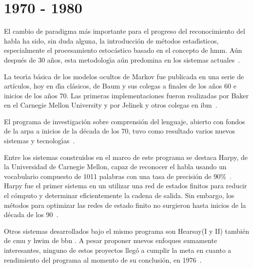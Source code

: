 \section{1970 - 1980}
\label{sec:70s}

El cambio de paradigma m\'as importante para el progreso del reconocimiento del habla ha sido, sin duda alguna,
la introducci\'on de m\'etodos estad{\'\i}sticos, especialmente el procesamiento estoc\'astico basado en el
concepto de \gls{hmm}. A\'un despu\'es de 30 a\~nos, esta metodolog{\'\i}a a\'un predomina en los
sistemas \mbox{actuales \cite{BakerResearch2009}}.

La teor{\'\i}a b\'asica de los modelos ocultos de Markov fue publicada en una serie de artículos, 
hoy en d{\'\i}a cl\'asicos, de Baum y sus colegas a finales de los a\~nos 60 e inicios de los a\~nos 70. 
Las primeras implementaciones fueron realizadas por Baker en el Carnegie Mellon University 
y por Jelinek y otros colegas en \mbox{\gls{ibm} \cite{Rabiner89atutorial}}.

El programa de investigaci\'on sobre comprensi\'on del lenguaje, abierto con fondos de la \gls{arpa} 
a inicios de la d\'ecada de los 70, tuvo como resultado varios nuevos sistemas y 
\mbox{tecnolog{\'\i}as \cite{Furui50Years2004}}.

Entre los sistemas construidos en el marco de este programa se destaca Harpy, de la Universidad de Carnegie Mellon,
capaz de reconocer el habla usando un vocabulario compuesto de 1011 palabras con una tasa de 
precisi\'on de \mbox{90\% \cite{Newell1978}.} Harpy fue el primer sistema en un utilizar una red de estados finitos
para reducir el c\'omputo y determinar eficientemente la cadena de salida. 
Sin embargo, los m\'etodos para optimizar las redes de estado finito no surgieron hasta inicios de
la d\'ecada de los \mbox{90 \cite{JuangAutomaticSpeech}}.

Otros sistemas desarrollados bajo el mismo programa son Hearsay(I y II) tambi\'en de \gls{cmu} y \gls{hwim} 
de \gls{bbn} \cite{JuangAutomaticSpeech}. A pesar proponer nuevos enfoques sumamente interesantes, 
ninguno de estos proyectos lleg\'o a cumplir la meta en cuanto a rendimiento
del programa al momento de su conclusi\'on, en \mbox{1976 \cite{JuangAutomaticSpeech}}.